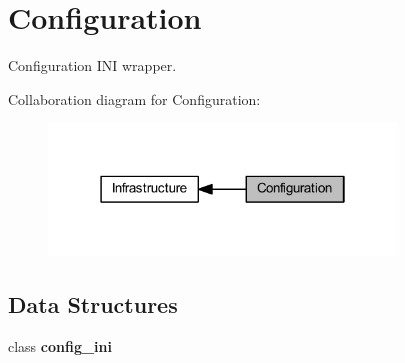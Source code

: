 \section{Configuration}
\label{group__configuration}


Configuration I\+NI wrapper.  


Collaboration diagram for Configuration\+:
\nopagebreak
\begin{figure}[H]
\begin{center}
\leavevmode
\includegraphics[width=262pt]{group__configuration}
\end{center}
\end{figure}
\subsection*{Data Structures}
\begin{DoxyCompactItemize}
\item 
class \textbf{ config\+\_\+ini}
\end{DoxyCompactItemize}
